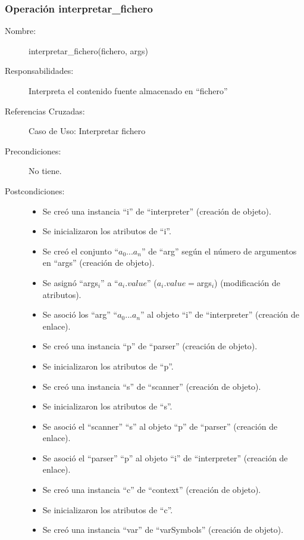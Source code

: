 \subsubsection{Operación interpretar\_fichero}
\FloatBarrier
\begin{framed}
	\begin{description}
		\item [Nombre:] interpretar\_fichero(fichero, args)
		\item [Responsabilidades:] Interpreta el contenido fuente almacenado en ``fichero''
		\item [Referencias Cruzadas: ] Caso de Uso: Interpretar fichero
      \item [Precondiciones:] No tiene.
      \item [Postcondiciones:] \hfill
      \begin {itemize}
         \item Se creó una instancia ``i'' de ``interpreter'' (creación de objeto).
         \item Se inicializaron los atributos de ``i''.
         \item Se creó el conjunto ``$a_0...a_n$'' de ``arg'' según el número de argumentos en ``args'' (creación de objeto).
         \item Se asignó ``args$_i$'' a ``$a_i.value$'' ($a_i.value = $args$_i$) (modificación de atributos).
         \item Se asoció los ``arg'' ``$a_0...a_n$'' al objeto ``i'' de ``interpreter'' (creación de enlace).
         \item Se creó una instancia ``p'' de ``parser'' (creación de objeto).
         \item Se inicializaron los atributos de ``p''.
         \item Se creó una instancia ``s'' de ``scanner'' (creación de objeto).
         \item Se inicializaron los atributos de ``s''.
         \item Se asoció el ``scanner'' ``s'' al objeto ``p'' de ``parser'' (creación de enlace).
         \item Se asoció el ``parser'' ``p'' al objeto ``i'' de ``interpreter'' (creación de enlace).
         \item Se creó una instancia ``c'' de ``context'' (creación de objeto).
         \item Se inicializaron los atributos de ``c''.
         \item Se creó una instancia ``var'' de ``varSymbols'' (creación de objeto).

\end{itemize}
\end{description}
\end{framed}
